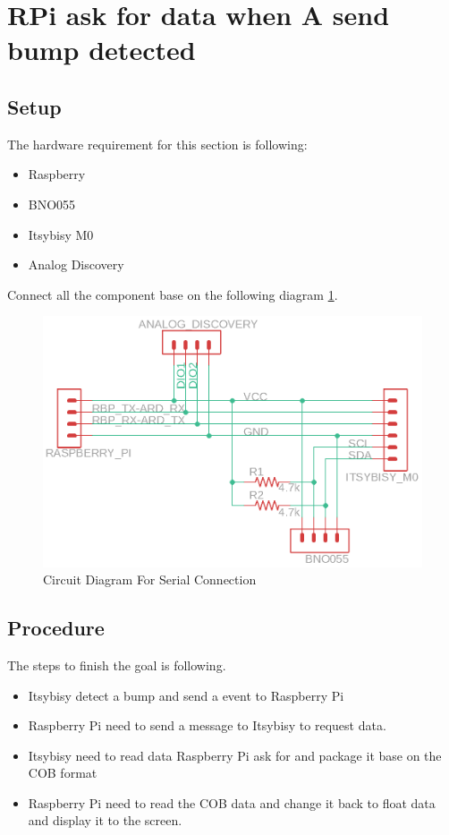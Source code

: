 \documentclass{article}
\begin{document}
	\section{RPi ask for data when A send bump detected}
	\subsection{Setup}
	The hardware requirement for this section is following:
	\begin{itemize}
		\item Raspberry
		\item BNO055
		\item Itsybisy M0
		\item Analog Discovery
	\end{itemize}
	Connect all the component base on the following diagram \ref{CNN1}.
	\begin{figure}[hb]
		\includegraphics[width=\textwidth]{img/Lab3_SerialConnection.png}
		\caption{Circuit Diagram For Serial Connection} 
		\label{CNN1}
	\end{figure}
	\subsection{Procedure}
		The steps to finish the goal is following.
	\begin{itemize}
		\item Itsybisy detect a bump and send a event to Raspberry Pi
		\item Raspberry Pi need to send a message to Itsybisy to request data.
		\item Itsybisy need to read data Raspberry Pi ask for and package it base on the COB format
		\item Raspberry Pi need to read the COB data and change it back to float data and display it to the screen.
	\end{itemize}
\end{document}
